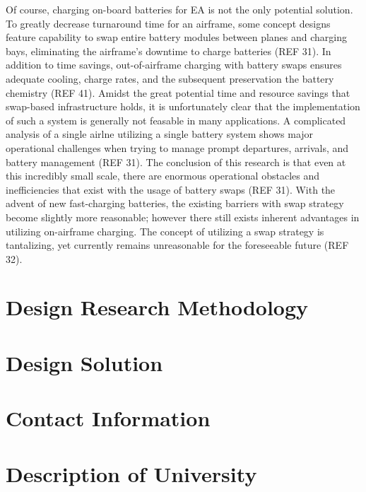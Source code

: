 \documentclass{article}
\begin{document}
Of course, charging on-board batteries for EA is not the only potential solution. 
To greatly decrease turnaround time for an airframe, some concept designs feature capability to swap entire battery modules between planes and charging bays, eliminating the airframe’s downtime to charge batteries (REF 31). 
In addition to time savings, out-of-airframe charging with battery swaps ensures adequate cooling, charge rates, and the subsequent preservation the battery chemistry (REF 41). 
Amidst the great potential time and resource savings that swap-based infrastructure holds, it is unfortunately clear that the implementation of such a system is generally not feasable in many applications. 
A complicated analysis of a single airlne utilizing a single battery system shows major operational challenges when trying to manage prompt departures, arrivals, and battery management (REF 31). 
The conclusion of this research is that even at this incredibly small scale, there are enormous operational obstacles and inefficiencies that exist with the usage of battery swaps (REF 31). 
With the advent of new fast-charging batteries, the existing barriers with swap strategy become slightly more reasonable; however there still exists inherent advantages in utilizing on-airframe charging.  
The concept of utilizing a swap strategy is tantalizing, yet currently remains unreasonable for the foreseeable future (REF 32).\par



\newpage

\newpage

\section{Design Research Methodology}\label{designReview}
\blindtext

\section{Design Solution}\label{solution}
\blindtext 


\newpage
\appendixpage
\appendix
\section{Contact Information}\label{apxA}


\section{Description of University}\label{apxB}
\blindtext
\end{document}
